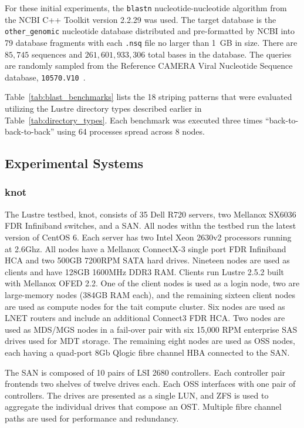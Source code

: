\documentclass[conference,compsoc]{IEEEtran}
\begin{document}
For these initial experiments, the \texttt{blastn} nucleotide-nucleotide algorithm from the NCBI C++ Toolkit version 2.2.29 was used. 
The target database is the \texttt{other\_genomic} nucleotide database distributed and pre-formatted by NCBI into 79 database fragments with each \texttt{.nsq} file no larger than 1~GB in size\cite{other_genomic}. There are $85,745$ sequences and $261,601,933,306$ total bases in the database. The queries are randomly sampled from the Reference CAMERA Viral Nucleotide Sequence database, \texttt{10570.V10}~\cite{10570}.





Table~\ref{tab:blast_benchmarks} lists the 18 striping patterns that were evaluated utilizing the Lustre directory types described earlier in Table~\ref{tab:directory_types}. Each benchmark was executed three times ``back-to-back-to-back'' using 64 processes spread across 8 nodes.



\subsection{Experimental Systems}

\subsubsection{knot}

The Lustre testbed, knot, consists of 35 Dell R720 servers, two Mellanox SX6036 FDR Infiniband switches, and a SAN. 
All nodes withn the testbed run the latest version of CentOS 6. 
Each server has two Intel Xeon 2630v2 processors running at 2.6Ghz.
All nodes have a Mellanox ConnectX-3 single port FDR Infiniband HCA and two 500GB 7200RPM SATA hard drives. 
Nineteen nodes are used as clients and have 128GB 1600MHz DDR3 RAM. 
Clients run Lustre 2.5.2 built with Mellanox OFED 2.2.
One of the client nodes is used as a login node, two are large-memory nodes (384GB RAM each), and 
the remaining sixteen client nodes are used as compute nodes for the tait compute cluster.
Six nodes are used as LNET routers and include an additional Connect3 FDR HCA. 
Two nodes are used as MDS/MGS nodes in a fail-over pair with six 15,000 RPM enterprise SAS drives used for MDT storage. 
The remaining eight nodes are used as OSS nodes, each having a quad-port 8Gb Qlogic fibre channel HBA connected to the SAN.

The SAN is composed of 10 pairs of LSI 2680 controllers. 
Each controller pair frontends two shelves of twelve drives each. 
Each OSS interfaces with one pair of controllers. 
The drives are presented as a single LUN, and ZFS is used to aggregate the individual drives that compose an OST. 
Multiple fibre channel paths are used for performance and redundancy.
\end{document}
